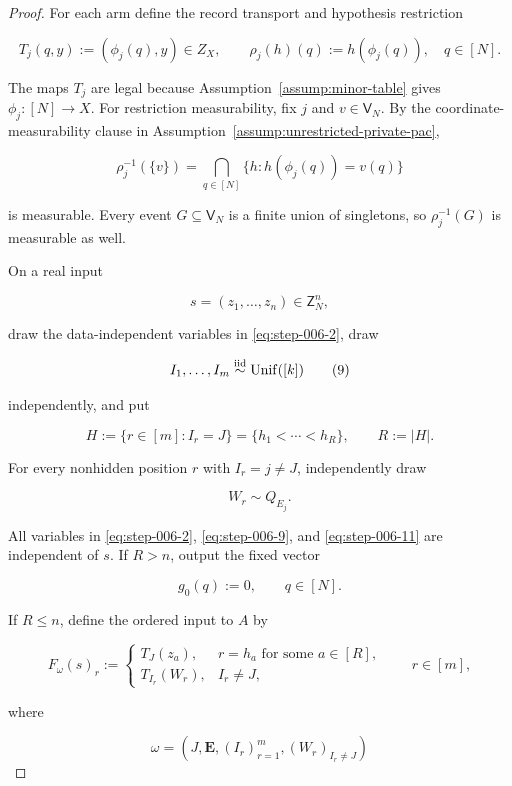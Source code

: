 \begin{proof}

For each arm define the record transport and hypothesis restriction

\[
T_j(q,y):=(\phi_j(q),y)\in Z_X,
\qquad
\rho_j(h)(q):=h(\phi_j(q)),\quad q\in[N].
\tag{6}\label{eq:step-006-6}
\]

The maps \(T_j\) are legal because Assumption~\ref{assump:minor-table} gives \(\phi_j:[N]\to X\). For restriction measurability, fix \(j\) and \(v \in \mathsf V_N\). By the coordinate-measurability clause in Assumption~\ref{assump:unrestricted-private-pac},

\[
\rho_j^{-1}(\{v\})
=\bigcap_{q\in[N]}
\{h:h(\phi_j(q))=v(q)\}
\tag{7}\label{eq:step-006-7}
\]

is measurable. Every event \(G\subseteq\mathsf V_N\) is a finite union of singletons, so \(\rho_j^{-1}(G)\) is measurable as well.

On a real input

\[
s=(z_1,\ldots,z_n)\in\mathsf Z_N^n,
\tag{8}\label{eq:step-006-8}
\]

draw the data-independent variables in \eqref{eq:step-006-2}, draw

\[
I_1,\ldots,I_m\stackrel{\rm iid}{\sim}\operatorname{Unif}([k])
\tag{9}\label{eq:step-006-9}
\]

independently, and put

\[
H:=\{r\in[m]:I_r=J\}
=\{h_1<\cdots<h_R\},
\qquad R:=|H|.
\tag{10}\label{eq:step-006-10}
\]

For every nonhidden position \(r\) with \(I_r=j\ne J\), independently draw

\[
W_r\sim Q_{E_j}.
\tag{11}\label{eq:step-006-11}
\]

All variables in \eqref{eq:step-006-2}, \eqref{eq:step-006-9}, and \eqref{eq:step-006-11} are independent of \(s\). If \(R>n\), output the fixed vector

\[
g_0(q):=0,\qquad q\in[N].
\tag{12}\label{eq:step-006-12}
\]

If \(R\le n\), define the ordered input to \(A\) by

\[
F_\omega(s)_r
:=
\begin{cases}
T_J(z_a),& r=h_a\text{ for some }a\in[R],\\
T_{I_r}(W_r),& I_r\ne J,
\end{cases}
\qquad r\in[m],
\tag{13}\label{eq:step-006-13}
\]

where

\[
\omega=(J,\mathbf E,(I_r)_{r=1}^m,(W_r)_{I_r\ne J})
\tag{14}\label{eq:step-006-14}
\]


\end{proof}
